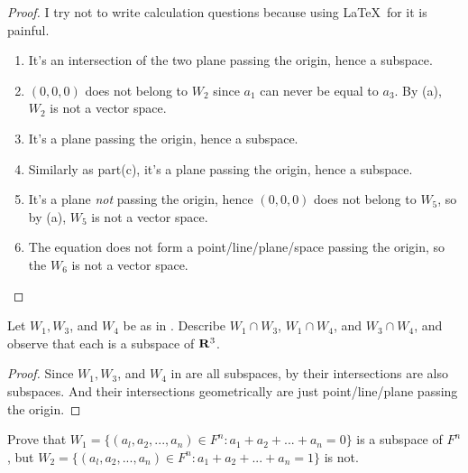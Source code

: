 \begin{proof}
I try not to write calculation questions because using \LaTeX\ for it is painful.

\begin{enumerate}
    \item It's an intersection of the two plane passing the origin, hence a subspace.
    \item \((0, 0, 0)\) does not belong to \(W_2\) since \(a_1\) can never be equal to \(a_3\).
          By (a), \(W_2\) is not a vector space.
    \item It's a plane passing the origin, hence a subspace.
    \item Similarly as part(c), it's a plane passing the origin, hence a subspace.
    \item It's a plane \emph{not} passing the origin, hence \((0, 0, 0)\) does not belong to \(W_5\), so by (a), \(W_5\) is not a vector space.
    \item The equation does not form a point/line/plane/space passing the origin, so the \(W_6\) is not a vector space.
\end{enumerate}
\end{proof}

\begin{exercise} \label{exercise 1.3.9}
Let \(W_1, W_3\), and \(W_4\) be as in .
Describe \(W_1 \cap W_3\), \(W_1 \cap W_4\), and \(W_3 \cap W_4\), and observe that each is a subspace of \(\mathbf{R}^3\).
\end{exercise}

\begin{proof}
Since \(W_1, W_3\), and \(W_4\) in  are all subspaces, by  their intersections are also subspaces.
And their intersections geometrically are just point/line/plane passing the origin.
\end{proof}

\begin{exercise} \label{exercise 1.3.10}
Prove that \(W_1 = \{ (a_l, a_2, ..., a_n) \in F^n: a_1 + a_2 + ... + a_n = 0 \} \) is a subspace of \(F^n\), but \(W_2 = \{ (a_l, a_2, ..., a_n) \in F^n : a_1 + a_2 + ... + a_n = 1\} \)
is not.
\end{exercise}

